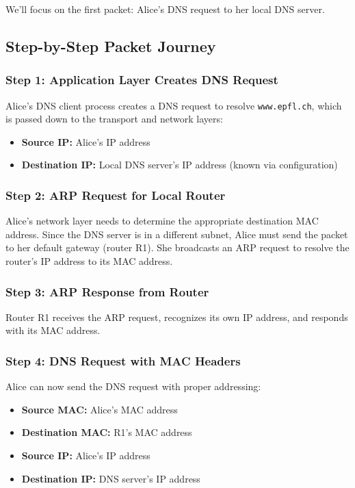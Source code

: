 \documentclass[../../compsys.tex]{subfiles}
\begin{document}
We'll focus on the first packet: Alice's DNS request to her local DNS server.

\subsection{Step-by-Step Packet Journey}

\subsubsection{Step 1: Application Layer Creates DNS Request}
Alice's DNS client process creates a DNS request to resolve \texttt{www.epfl.ch}, which is passed down to the transport and network layers:
\begin{itemize}
    \item \textbf{Source IP:} Alice's IP address
    \item \textbf{Destination IP:} Local DNS server's IP address (known via configuration)
\end{itemize}

\subsubsection{Step 2: ARP Request for Local Router}
Alice's network layer needs to determine the appropriate destination MAC address. Since the DNS server is in a different subnet, Alice must send the packet to her default gateway (router R1). She broadcasts an ARP request to resolve the router's IP address to its MAC address.

\subsubsection{Step 3: ARP Response from Router}
Router R1 receives the ARP request, recognizes its own IP address, and responds with its MAC address.

\subsubsection{Step 4: DNS Request with MAC Headers}
Alice can now send the DNS request with proper addressing:
\begin{itemize}
    \item \textbf{Source MAC:} Alice's MAC address
    \item \textbf{Destination MAC:} R1's MAC address
    \item \textbf{Source IP:} Alice's IP address  
    \item \textbf{Destination IP:} DNS server's IP address
\end{itemize}
\end{document}
